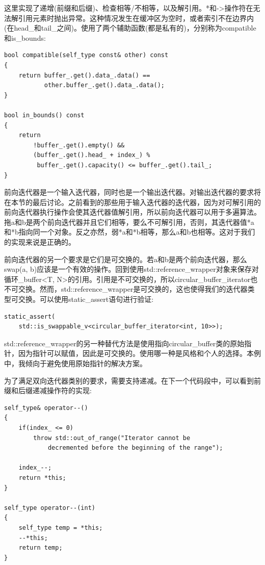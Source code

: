 这里实现了递增(前缀和后缀)、检查相等/不相等，以及解引用。*和->操作符在无法解引用元素时抛出异常。这种情况发生在缓冲区为空时，或者索引不在边界内(在head\_和tail\_之间)。使用了两个辅助函数(都是私有的)，分别称为compatible和is\_bounds:

\begin{lstlisting}[style=styleCXX]
bool compatible(self_type const& other) const
{
	return buffer_.get().data_.data() ==
		   other.buffer_.get().data_.data();
}

bool in_bounds() const
{
	return
		!buffer_.get().empty() &&
		(buffer_.get().head_ + index_) %
		 buffer_.get().capacity() <= buffer_.get().tail_;
}
\end{lstlisting}

前向迭代器是一个输入迭代器，同时也是一个输出迭代器。对输出迭代器的要求将在本节的最后讨论。之前看到的那些用于输入迭代器的迭代器，因为对可解引用的前向迭代器执行操作会使其迭代器值解引用，所以前向迭代器可以用于多遍算法。拖a和b是两个前向迭代器并且它们相等，要么不可解引用，否则，其迭代器值*a和*b指向同一个对象。反之亦然，弱*a和*b相等，那么a和b也相等。这对于我们的实现来说是正确的。

前向迭代器的另一个要求是它们是可交换的。若a和b是两个前向迭代器，那么swap(a, b)应该是一个有效的操作。回到使用std::reference\_wrapper对象来保存对循环\_buffer<T, N>的引用。引用是不可交换的，所以circular\_buffer\_iterator也不可交换。然而，std::reference\_wrapper是可交换的，这也使得我们的迭代器类型可交换。可以使用static\_assert语句进行验证:

\begin{lstlisting}[style=styleCXX]
static_assert(
	std::is_swappable_v<circular_buffer_iterator<int, 10>>);
\end{lstlisting}

\begin{tcolorbox}[breakable,enhanced jigsaw,colback=blue!5!white,colframe=blue!75!black,title={重要的Note}]
std::reference\_wrapper的另一种替代方法是使用指向circular\_buffer类的原始指针，因为指针可以赋值，因此是可交换的。使用哪一种是风格和个人的选择。本例中，我倾向于避免使用原始指针的解决方案。
\end{tcolorbox}

为了满足双向迭代器类别的要求，需要支持递减。在下一个代码段中，可以看到前缀和后缀递减操作符的实现:

\begin{lstlisting}[style=styleCXX]
self_type& operator--()
{
	if(index_ <= 0)
		throw std::out_of_range("Iterator cannot be
			decremented before the beginning of the range");
			
	index_--;
	return *this;
}

self_type operator--(int)
{
	self_type temp = *this;
	--*this;
	return temp;
}
\end{lstlisting}

